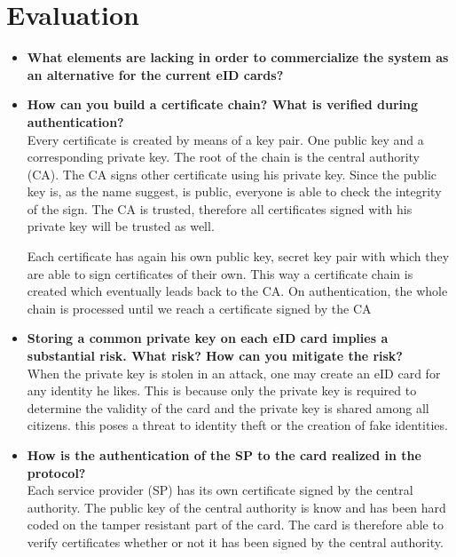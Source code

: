 \documentclass[12pt]{report}
\begin{document}
\section{Evaluation}
\begin{itemize}
\item \textbf{What elements are lacking in order to commercialize the system as an alternative for the current eID cards?}\\

\item \textbf{How can you build a certificate chain? What is verified during authentication?}\\
Every certificate is created by means of a key pair. One public key and a corresponding private key. The root of the chain is the central authority (CA). The CA signs other certificate using his private key. Since the public key is, as the name suggest, is public, everyone is able to check the integrity of the sign. The CA is trusted, therefore all certificates signed with his private key will be trusted as well.

Each certificate has again his own public key, secret key pair with which they are able to sign certificates of their own. This way a certificate chain is created which eventually leads back to the CA. On authentication, the whole chain is processed until we reach a certificate signed by the CA

\item \textbf{Storing a common private key on each eID card implies a substantial risk. What risk? How can you mitigate the risk?}\\
When the private key is stolen in an attack, one may create an eID card for any identity he likes. This is because only the private key is required to determine the validity of the card and the private key is shared among all citizens. this poses a threat to identity theft or the creation of fake identities.

\item \textbf{How is the authentication of the SP to the card realized in the protocol?}\\
Each service provider (SP) has its own certificate signed by the central authority. The public key of the central authority is know and has been hard coded on the tamper resistant part of the card. The card is therefore able to verify certificates whether or not it has been signed by the central authority. 


\end{itemize}
\end{document}
